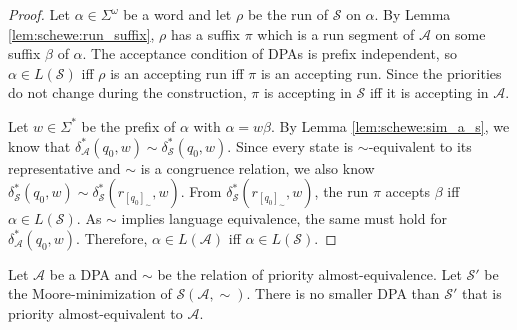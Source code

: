 \begin{proof}
	Let $\alpha \in \Sigma^\omega$ be a word and let $\rho$ be the run of $\mathcal{S}$ on $\alpha$. By Lemma \ref{lem:schewe:run_suffix}, $\rho$ has a suffix $\pi$ which is a run segment of $\mathcal{A}$ on some suffix $\beta$ of $\alpha$. The acceptance condition of DPAs is prefix independent, so $\alpha \in L(\mathcal{S})$ iff $\rho$ is an accepting run iff $\pi$ is an accepting run. Since the priorities do not change during the construction, $\pi$ is accepting in $\mathcal{S}$ iff it is accepting in $\mathcal{A}$.
	
	Let $w \in \Sigma^*$ be the prefix of $\alpha$ with $\alpha = w \beta$. By Lemma \ref{lem:schewe:sim_a_s}, we know that $\delta^*_\mathcal{A}(q_0, w) \sim \delta^*_\mathcal{S}(q_0, w)$. Since every state is $\sim$-equivalent to its representative and $\sim$ is a congruence relation, we also know $\delta^*_\mathcal{S}(q_0, w) \sim \delta^*_\mathcal{S}(r_{[q_0]_\sim}, w)$. From $\delta^*_\mathcal{S}(r_{[q_0]_\sim}, w)$, the run $\pi$ accepts $\beta$ iff $\alpha \in L(\mathcal{S})$. As $\sim$ implies language equivalence, the same must hold for $\delta^*_\mathcal{A}(q_0, w)$. Therefore, $\alpha \in L(\mathcal{A})$ iff $\alpha \in L(\mathcal{S})$.
\end{proof}


\begin{lem}
	Let $\mathcal{A}$ be a DPA and $\sim$ be the relation of priority almost-equivalence. Let $\mathcal{S}'$ be the Moore-minimization of $\mathcal{S}(\mathcal{A}, \sim)$. There is no smaller DPA than $\mathcal{S}'$ that is priority almost-equivalent to $\mathcal{A}$.
\end{lem}

